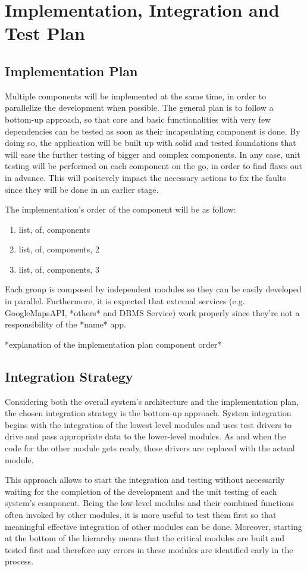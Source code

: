 \documentclass[table, 12pt]{article}
\begin{document}
\section{Implementation, Integration and Test Plan}
\subsection{Implementation Plan}
Multiple components will be implemented at the same time, in order to parallelize the development when possible. The general plan is to follow a bottom-up approach, so that core and basic functionalities with very few dependencies can be tested as soon as their incapsulating component is done. By doing so, the application will be built up with solid and tested foundations that will ease the further testing of bigger and complex components. In any case, unit testing will be performed on each component on the go, in order to find flaws out in advance. This will positevely impact the necessary actions to fix the faults since they will be done in an earlier stage.

The implementation's order of the component will be as follow:
\begin{enumerate}
    \item list, of, components
    \item list, of, components, 2
    \item list, of, components, 3
\end{enumerate}
Each group is composed by independent modules so they can be easily developed in parallel.
Furthermore, it is expected that external services (e.g. GoogleMapsAPI, *others* and DBMS Service) work properly since they're not a responsibility of the *name* app.

*explanation of the implementation plan component order*
\subsection{Integration Strategy}
Considering both the overall system's architecture and the implementation
plan, the chosen integration strategy is the bottom-up approach. System
integration begins with the integration of the lowest level modules and uses
test drivers to drive and pass appropriate data to the lower-level modules. As
and when the code for the other module gets ready, these drivers are replaced
with the actual module.

This approach allows to start the integration and testing without necessarily
waiting for the completion of the development and the unit testing of each
system's component. Being the low-level modules and their combined functions
often invoked by other modules, it is more useful to test them first so that
meaningful effective integration of other modules can be done. Moreover,
starting at the bottom of the hierarchy means that the critical modules are built
and tested first and therefore any errors in these modules are identified early in
the process.
\end{document}
